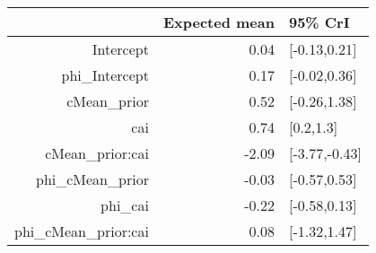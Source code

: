 \begin{tabular}{rrl}
  \hline
 & Expected mean & 95\% CrI \\ 
  \hline
Intercept & 0.04 & [-0.13,0.21] \\ 
  phi\_Intercept & 0.17 & [-0.02,0.36] \\ 
  cMean\_prior & 0.52 & [-0.26,1.38] \\ 
  cai & 0.74 & [0.2,1.3] \\ 
  cMean\_prior:cai & -2.09 & [-3.77,-0.43] \\ 
  phi\_cMean\_prior & -0.03 & [-0.57,0.53] \\ 
  phi\_cai & -0.22 & [-0.58,0.13] \\ 
  phi\_cMean\_prior:cai & 0.08 & [-1.32,1.47] \\ 
   \hline
\end{tabular}

